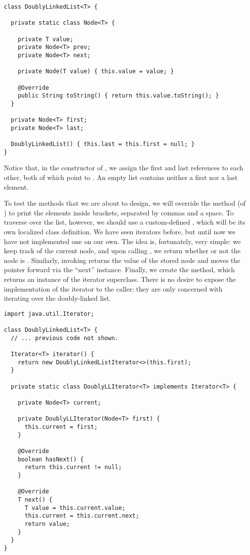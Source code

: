 \enlargethispage{2\baselineskip}
\begin{lstlisting}[language=MyJava]
class DoublyLinkedList<T> {

  private static class Node<T> {

    private T value;
    private Node<T> prev;
    private Node<T> next;

    private Node(T value) { this.value = value; }

    @Override
    public String toString() { return this.value.toString(); }
  }

  private Node<T> first;
  private Node<T> last;

  DoublyLinkedList() { this.last = this.first = null; }
}
\end{lstlisting}

Notice that, in the constructor of , we assign the first and last references to each other, both of which point to . 
An empty list contains neither a first nor a last element.

To test the methods that we are about to design, we will override the  method (of ) to print the elements inside brackets, separated by commas and a space. To traverse over the list, however, we should use a custom-defined , which will be its own localized class definition. We have seen iterators before, but until now we have not implemented one on our own. The idea is, fortunately, very simple: we keep track of the current node, and upon calling , we return whether or not the node is . Similarly, invoking  returns the value of the stored node and moves the pointer forward via the ``next'' instance. Finally, we create the  method, which returns an instance of the iterator superclass. There is no desire to expose the implementation of the iterator to the caller; they are only concerned with iterating over the doubly-linked list.

\begin{lstlisting}[language=MyJava]
import java.util.Iterator;

class DoublyLinkedList<T> {
  // ... previous code not shown.

  Iterator<T> iterator() {
    return new DoublyLinkedListIterator<>(this.first);
  }

  private static class DoublyLLIterator<T> implements Iterator<T> {
    
    private Node<T> current;

    private DoublyLLIterator(Node<T> first) {
      this.current = first;
    }

    @Override
    boolean hasNext() { 
      return this.current != null; 
    }

    @Override
    T next() {
      T value = this.current.value;
      this.current = this.current.next;
      return value;
    }
  }
}
\end{lstlisting}

